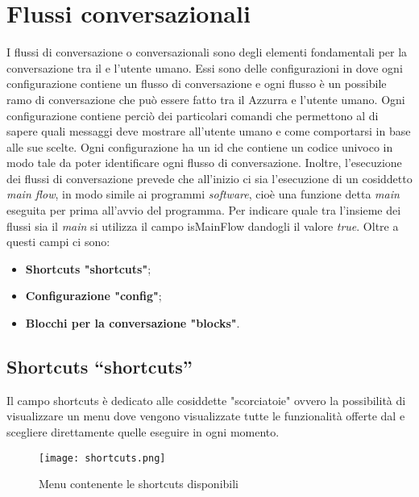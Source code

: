 \section{Flussi conversazionali}
I flussi di conversazione o conversazionali sono degli elementi fondamentali per la conversazione tra il  e l'utente umano. Essi sono delle configurazioni in  dove ogni configurazione contiene un flusso di conversazione e ogni flusso è un possibile ramo di conversazione che può essere fatto tra il  Azzurra e l'utente umano. Ogni configurazione contiene perciò dei particolari comandi che permettono al  di sapere quali messaggi deve mostrare all'utente umano e come comportarsi in base alle sue scelte. Ogni configurazione ha un id che contiene un codice univoco in modo tale da poter identificare ogni flusso di conversazione. Inoltre, l'esecuzione dei flussi di conversazione prevede che all'inizio ci sia l'esecuzione di un cosiddetto \emph{main flow}, in modo simile ai programmi \emph{software}, cioè una funzione detta \emph{main} eseguita per prima all'avvio del programma. Per indicare quale tra l'insieme dei flussi sia il \emph{main} si utilizza il campo isMainFlow dandogli il valore \emph{true}.
Oltre a questi campi ci sono:\\
\begin{itemize}
	\item \textbf{Shortcuts "shortcuts"};
	\item \textbf{Configurazione "config"};
	\item \textbf{Blocchi per la conversazione "blocks"}.
\end{itemize}

\subsection{Shortcuts “shortcuts”}
Il campo shortcuts è dedicato alle cosiddette "scorciatoie" ovvero la possibilità di visualizzare un menu dove vengono visualizzate tutte le funzionalità offerte dal  e scegliere direttamente quelle eseguire in ogni momento.

\begin{figure}[htbp]
	\centering
	\texttt{[image: shortcuts.png]}
	\caption{Menu contenente le shortcuts disponibili}
\end{figure}

